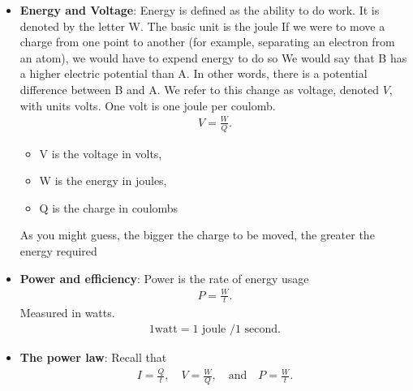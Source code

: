 \documentclass{report}
\begin{document}
\begin{itemize}
            \begin{align*}
                1 \text{ amp} = 1 \text{ coulomb} / 1 \text{ second}
            .\end{align*}
            Thus, current for current $I$, charge $Q$, and time $t$,
            \begin{align*}
                I = \frac{Q}{t}
            .\end{align*}
        \item \textbf{Energy and Voltage}:  Energy is defined as the ability to do work. It is denoted by the letter W. The basic unit is the joule
            \bigbreak \noindent 
            If we were to move a charge from one point to another (for example, separating an electron from an atom), we would have to expend energy to do so
            \bigbreak \noindent 
            We would say that B has a higher electric potential than A. In other words, there is a potential difference between B and A. We refer to this change as voltage, denoted $V$, with units volts. One volt is one joule per coulomb.
            \begin{align*}
                V = \frac{W}{Q} 
            .\end{align*}
            \begin{itemize}
                \item V is the voltage in volts,
                \item W is the energy in joules,
                \item Q is the charge in coulombs
            \end{itemize}
            As you might guess, the bigger the charge to be moved, the greater the energy required
        \item \textbf{Power and efficiency}: Power is the rate of energy usage
            \begin{align*}
                P = \frac{W}{t}
            .\end{align*}
            Measured in watts.
            \begin{align*}
                1 \text{watt} = 1 \text{ joule } / 1 \text{ second}
            .\end{align*}
        \item \textbf{The power law}: Recall that
            \begin{align*}
                I = \frac{Q}{t}, \quad V = \frac{W}{Q}, \quad \text{and} \quad P = \frac{W}{t}
            .\end{align*}

\end{itemize}
\end{document}
